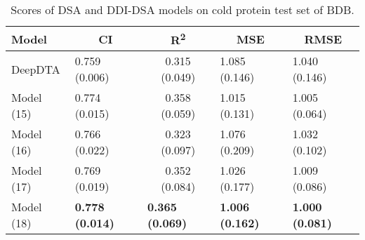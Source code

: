 \begin{table}
\centering
\caption{Scores of DSA and DDI-DSA models on cold protein test set of BDB.}
\vspace{0.25em}
\begin{tabular}{|l|l|c|l|l|} 
\hline
Model & \multicolumn{1}{c|}{CI} & R\textsuperscript{2} & \multicolumn{1}{c|}{MSE} & \multicolumn{1}{c|}{RMSE} \\ 
\hline
DeepDTA & 0.759 (0.006) & 0.315 (0.049) & 1.085 (0.146) & 1.040 (0.146) \\ 
\hline
Model (15) & 0.774 (0.015) & 0.358 (0.059) & 1.015 (0.131) & 1.005 (0.064) \\ 
\hline
Model (16) & 0.766 (0.022) & 0.323 (0.097) & 1.076 (0.209) & 1.032 (0.102) \\ 
\hline
Model (17) & 0.769 (0.019) & 0.352 (0.084) & 1.026 (0.177) & 1.009 (0.086) \\ 
\hline
Model (18) & \textbf{0.778 (0.014)} & \multicolumn{1}{l|}{\textbf{0.365 (0.069)}} & \textbf{1.006 (0.162)} & \textbf{1.000 (0.081)} \\
\hline
\end{tabular}
\label{tab:side_protein}
\end{table}